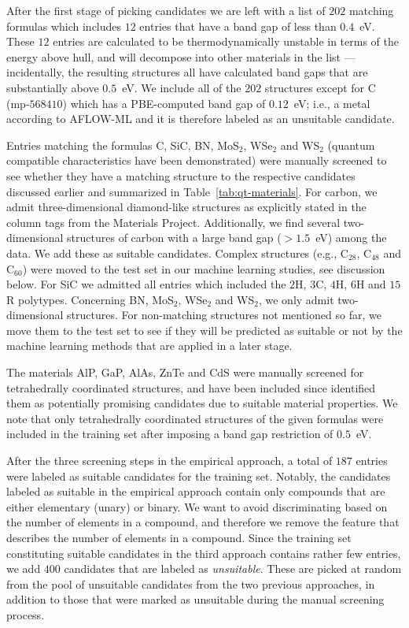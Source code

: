 \documentclass[superscriptaddress,unsortedaddress,
 amsmath,amssymb,
 aps,
]{revtex4-2}
\begin{document}
After the first stage of picking candidates we are left with a list of $202$ matching formulas which includes $12$ entries that have a band gap of less than $0.4$~eV. These $12$ entries are calculated to be thermodynamically unstable in terms of the energy above hull, and will decompose into other materials in the list --- incidentally, the resulting structures all have calculated band gaps that are substantially above $0.5$~eV. We include all of the $202$ structures except for C (mp-$568410$) which has a PBE-computed band gap of $0.12$~eV; i.e., a metal according to AFLOW-ML and it is therefore labeled as an unsuitable candidate. 
 
Entries matching the formulas C, SiC, BN, MoS$_2$, WSe$_2$ and WS$_2$ (quantum compatible characteristics have been demonstrated) were manually screened to see whether they have a matching structure to the respective candidates discussed earlier and summarized in Table~\ref{tab:qt-materials}. 
For carbon, we admit three-dimensional diamond-like structures as explicitly stated in the column tags from the Materials Project. Additionally, we find several two-dimensional structures of carbon with a large band gap ($>1.5$~eV) among the data. We add these as suitable candidates. Complex structures (e.g., C$_{28}$, C$_{48}$ and C$_{60}$) were moved to the test set in our machine learning studies, see discussion below. For SiC we admitted all entries which included the $2$H, $3$C, $4$H, $6$H and $15$R polytypes. Concerning BN, MoS$_2$, WSe$_2$ and WS$_2$, we only admit two-dimensional structures. For non-matching structures not mentioned so far, we move them to the test set to see if they will be predicted as suitable or not by the machine learning methods that are applied in a later stage.

The materials AlP, GaP, AlAs, ZnTe and CdS were manually screened for tetrahedrally coordinated structures, and have been included since \citeauthor{Weber2010} \cite{Weber2010} identified them as potentially promising candidates due to suitable material properties. 
We note that only tetrahedrally coordinated structures of the given formulas were included in the training set after imposing a band gap restriction of $0.5$~eV. 

After the three screening steps in the empirical approach, a total of $187$ entries were labeled as suitable candidates for the training set. 
Notably, the candidates labeled as suitable in the empirical approach contain only compounds that are either elementary (unary) or binary. 
We want to avoid discriminating based on the number of elements in a compound, and therefore we remove the feature that describes the number of elements in a compound. 
Since the training set constituting suitable candidates in the third approach contains rather few entries, we add $400$ candidates that are labeled as \emph{unsuitable}. These are picked at random from the pool of unsuitable candidates from the two previous approaches, in addition to those that were marked as unsuitable during the manual screening process. 
\end{document}
